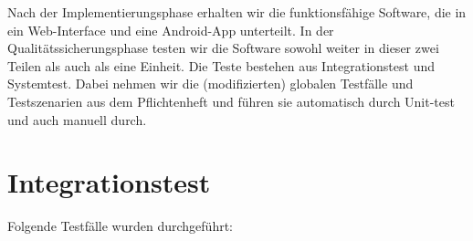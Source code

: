 \documentclass[a4paper]{scrreprt}
\begin{document}
        Nach der Implementierungsphase erhalten wir die funktionsf\"ahige Software, die in ein Web-Interface und eine Android-App unterteilt. In der Qualit\"atssicherungsphase testen wir die Software sowohl weiter in dieser zwei Teilen als auch als eine Einheit. Die Teste bestehen aus Integrationstest und Systemtest. Dabei nehmen wir die (modifizierten) globalen Testf\"alle und Testszenarien aus dem Pflichtenheft und f\"uhren sie automatisch durch Unit-test und auch manuell durch.



			

      \newpage
      \chapter{Integrationstest}
      Folgende Testf\"alle wurden durchgef\"uhrt:
\end{document}
